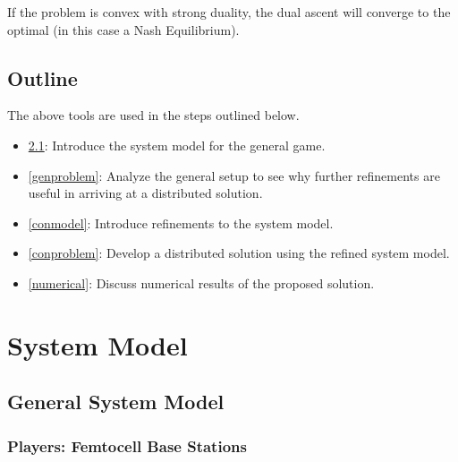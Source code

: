 \begin{enumerate}
If the problem is convex with strong duality, the dual ascent will converge to the optimal (in this case a Nash Equilibrium).

\end{enumerate}




\section{Outline}
The above tools are used in the steps outlined below. 
\begin{itemize}
\item 
\ref{genmodel}: Introduce the system model for the general game.
\item 
\ref{genproblem}: Analyze the general setup to see why further refinements are useful in arriving at a distributed solution. 
\item
\ref{conmodel}: Introduce refinements to the system model.
\item 
\ref{conproblem}: Develop a distributed solution using the refined system model.
\item 
\ref{numerical}: Discuss numerical results of the proposed solution. 
\end{itemize}
\chapter{System Model}

\section{General System Model}\label{genmodel}

\subsection{Players: Femtocell Base Stations}


